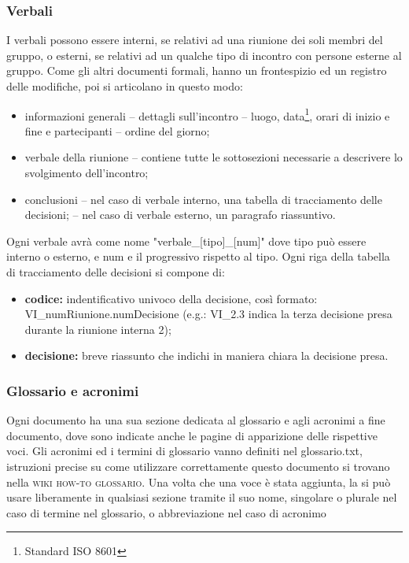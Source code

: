         \subsubsection{Verbali}
            I verbali possono essere interni, se relativi ad una riunione dei soli membri del gruppo, o esterni, se relativi ad un qualche tipo di incontro con persone esterne al gruppo. Come gli altri documenti formali, hanno un frontespizio ed un registro delle modifiche, poi si articolano in questo modo:
            \begin{itemize}
                \item informazioni generali
                    \subitem -- dettagli sull'incontro
                        \subsubitem -- luogo, data\footnote{Standard ISO 8601}, orari di inizio e fine e partecipanti
                    \subitem -- ordine del giorno;
                \item verbale della riunione
                    \subitem -- contiene tutte le sottosezioni necessarie a descrivere lo svolgimento dell'incontro;
                \item conclusioni
                    \subitem -- nel caso di verbale interno, una tabella di tracciamento delle decisioni;
                    \subitem -- nel caso di verbale esterno, un paragrafo riassuntivo.
            \end{itemize}
            Ogni verbale avrà come nome "verbale\_[tipo]\_[num]" dove tipo può essere interno o esterno, e num e il progressivo rispetto al tipo.
                Ogni riga della tabella di tracciamento delle decisioni si compone di:
                \begin{itemize}
                    \item \textbf{codice: }indentificativo univoco della decisione, così formato: VI\_numRiunione.numDecisione (e.g.: VI\_2.3 indica la terza decisione presa durante la riunione interna 2);
                    \item \textbf{decisione: }breve riassunto che indichi in maniera chiara la decisione presa.
                \end{itemize}
        \subsubsection{Glossario e acronimi}
            Ogni documento ha una sua sezione dedicata al glossario e agli acronimi a fine documento, dove sono indicate anche le pagine di apparizione delle rispettive voci.
                Gli acronimi ed i termini di glossario vanno definiti nel glossario.txt, istruzioni precise su come utilizzare correttamente questo documento si trovano nella \textsc{wiki how-to glossario}. Una volta che una voce è stata aggiunta, la si può usare liberamente in qualsiasi sezione tramite il suo nome, singolare o plurale nel caso di termine nel glossario, o abbreviazione nel caso di acronimo

